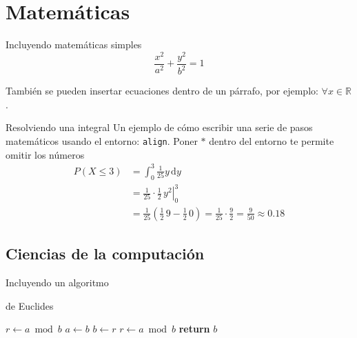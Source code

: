 \section{Matemáticas}
\begin{frame}{Incluyendo matemáticas simples}
 \begin{equation}
 \label{eq:elipse}
 \frac{x^{2}}{a^{2}} + \frac{y^{2}}{b^{2}} = 1
 \end{equation}
 
  También se pueden insertar ecuaciones dentro de un párrafo, por ejemplo: $\forall x \in \mathbb{R}$.
\end{frame}

\begin{frame}{Resolviendo una integral}
Un ejemplo de cómo escribir una serie de pasos matemáticos usando el entorno: \texttt{align}.
Poner $*$ dentro del entorno te permite omitir los números
\begin{align*}
P\left(X \leq 3 \right) &= \int_{0}^{3} \frac{1}{25} y \,\mathrm{d}y \\
     &= \left. \frac{1}{25} \cdot \frac{1}{2} \, y^{2} \right|_0^3 \\
     &= \frac{1}{25} \left( \frac{1}{2} \, 9 - \frac{1}{2} \, 0 \right) =
     \frac{1}{25} \cdot \frac{9}{2} = \frac{9}{50} \approx 0.18 
\end{align*}
\end{frame}

\subsection{Ciencias de la computación}
\begin{frame}{Incluyendo un algoritmo}
\begin{algorithm}[H]
\renewcommand{\thealgorithm}{} %
\caption{de Euclides}
\label{alg:euclid}
\begin{algorithmic}[1] %
     
    \State $r\gets a \bmod b$
     
        \State $a \gets b$
        \State $b \gets r$
        \State $r \gets a \bmod b$
    \EndWhile\label{euclidendwhile}
    \State \textbf{return} $b$
    \EndProcedure
\end{algorithmic}
\end{algorithm}

\end{frame}

